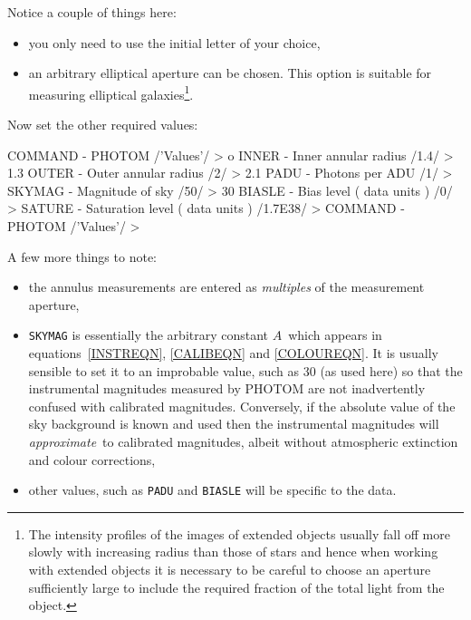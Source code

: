 \documentclass[twoside,11pt,nolof]{starlink}
\begin{document}
\begin{enumerate}
   Notice a couple of things here:

  \begin{itemize}

    \item you only need to use the initial letter of your choice,

    \item an arbitrary elliptical aperture can be chosen. This option is
     suitable for measuring elliptical galaxies\footnote{The intensity
     profiles of the images of extended objects usually fall off more
     slowly with increasing radius than those of stars and hence when
     working with extended objects it is necessary to be careful to choose
     an aperture sufficiently large to include the required fraction of the
     total light from the object.}.

\end{itemize}

   Now set the other required values:

\begin{terminalv}
COMMAND - PHOTOM /'Values'/ > o
INNER - Inner annular radius /1.4/ > 1.3
OUTER - Outer annular radius /2/ > 2.1
PADU - Photons per ADU /1/ >
SKYMAG - Magnitude of sky /50/ > 30
BIASLE - Bias level ( data units ) /0/ >
SATURE - Saturation level ( data units ) /1.7E38/ >
COMMAND - PHOTOM /'Values'/ >
\end{terminalv}

   A few more things to note:

  \begin{itemize}

    \item the annulus measurements are entered as \textit{multiples} of the
     measurement aperture,

    \item \texttt{SKYMAG} is essentially the arbitrary constant $A$\,
     which appears in equations~\ref{INSTREQN}, \ref{CALIBEQN} and
     \ref{COLOUREQN}.  It is usually sensible to set it to an
     improbable value, such as 30 (as used here) so that the
     instrumental magnitudes measured by PHOTOM are not inadvertently
     confused with calibrated magnitudes.  Conversely, if the absolute
     value of the sky background is known and used then the instrumental
     magnitudes will \textit{approximate}\, to calibrated magnitudes,
     albeit without atmospheric extinction and colour corrections,

    \item other values, such as \texttt{PADU} and \texttt{BIASLE} will be
     specific to the data.


\end{itemize}
\end{enumerate}
\end{document}
